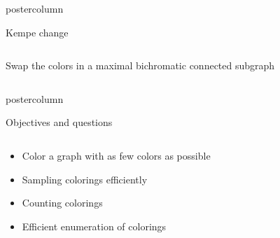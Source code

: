 \begin{frame}
\begin{columns}
\begin{column}{.49\textwidth}
\begin{beamercolorbox}[center,wd=\textwidth]{postercolumn}
\begin{minipage}[T]{.95\textwidth}
\begin{block}{Kempe change}
\begin{columns}
\begin{column}{.49\textwidth}
              \end{column}
            \end{columns}
            \vspace{1cm}
            Swap the colors in a maximal bichromatic connected subgraph
            
          \end{block}

        \end{minipage}
      \end{beamercolorbox}
    \end{column}
  \end{columns}

  \begin{beamercolorbox}[center,wd=\textwidth]{postercolumn}
    \begin{minipage}[T]{.97\textwidth}
      \begin{block}{Objectives and questions}            
        \centering
        \begin{columns}
          \begin{column}{.49\textwidth}
            \begin{itemize}
            \item Color a graph  with as few colors as possible
            \item Sampling colorings efficiently
            \item Counting colorings
            \item Efficient enumeration of colorings 
            \end{itemize}
            

\end{column}
\end{columns}
\end{block}
\end{minipage}
\end{beamercolorbox}
\end{frame}
